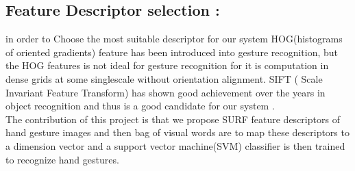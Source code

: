 \subsection{Feature Descriptor selection :}
in order to Choose the most suitable descriptor for our system HOG(histograms of oriented gradients) feature has been introduced into gesture recognition, but the HOG features is not ideal for gesture recognition for it is computation in dense grids at some singlescale without orientation alignment. SIFT ( Scale
Invariant Feature Transform) has shown good achievement over the years in object recognition and thus is a good candidate for our system .\\ The contribution of this project is that we propose SURF
feature descriptors of hand gesture images and then bag of
visual words are to map these descriptors to a dimension vector and a  support vector machine(SVM) classifier is then  trained to
recognize hand gestures.
